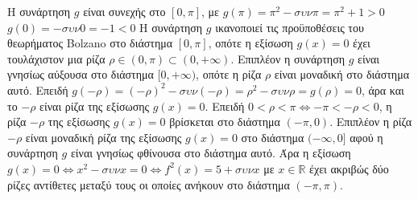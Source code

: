 \begin{alist}
\begin{rlist}
    Η συνάρτηση $g$ είναι συνεχής στο $[0,\pi]$, με
    $g(\pi)=\pi^2-\sigma\upsilon\nu \pi = \pi^2+1 > 0$
    $g(0)=-\sigma\upsilon\nu 0 = -1 < 0$
    Η συνάρτηση $g$ ικανοποιεί τις προϋποθέσεις του θεωρήματος Bolzano στο διάστημα $[0,\pi]$, οπότε η εξίσωση $g(x)=0$ έχει τουλάχιστον μια ρίζα $\rho \in (0, \pi) \subset (0, +\infty)$. Επιπλέον η συνάρτηση $g$ είναι γνησίως αύξουσα στο διάστημα $[0, +\infty)$, οπότε η ρίζα $\rho$ είναι μοναδική στο διάστημα αυτό.
    Επειδή $g(-\rho)=(-\rho)^2-\sigma\upsilon\nu(-\rho)=\rho^2-\sigma\upsilon\nu \rho = g(\rho)=0$, άρα και το $-\rho$ είναι ρίζα της εξίσωσης $g(x)=0$. Επειδή $0 < \rho < \pi \Leftrightarrow -\pi < -\rho < 0$, η ρίζα $-\rho$ της εξίσωσης $g(x)=0$ βρίσκεται στο διάστημα $(-\pi,0)$.
    Επιπλέον η ρίζα $-\rho$ είναι μοναδική ρίζα της εξίσωσης $g(x)=0$ στο διάστημα $(-\infty, 0]$ αφού η συνάρτηση $g$ είναι γνησίως φθίνουσα στο διάστημα αυτό.
    Άρα η εξίσωση $g(x)=0 \Leftrightarrow x^2-\sigma\upsilon\nu x=0 \Leftrightarrow f^2(x)=5+\sigma\upsilon\nu x$ με $x \in \mathbb{R}$ έχει ακριβώς δύο ρίζες αντίθετες μεταξύ τους οι οποίες ανήκουν στο διάστημα $(-\pi, \pi)$.
\end{rlist}
\end{alist}